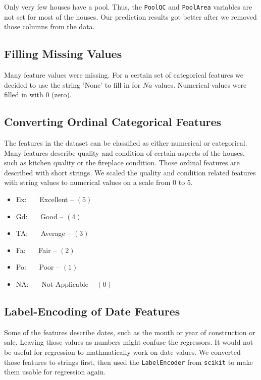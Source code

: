 Only very few houses have a pool. Thus, the \texttt{PoolQC} and \texttt{PoolArea} variables are not set for most of the houses. Our prediction results got better after we removed those columns from the data.

\subsection{Filling Missing Values}

Many feature values were missing. For a certain set of categorical features we decided to use the string 'None' to fill in for $Na$ values. Numerical values were filled in with 0 (zero).

\subsection{Converting Ordinal Categorical Features}

The features in the dataset can be classified as either numerical or categorical. Many features describe quality and condition of certain aspects of the houses, such as kitchen quality or the fireplace condition. Those ordinal features are described with short strings. We scaled the quality and condition related features with string values to numerical values on a scale from 0 to 5.

\begin{itemize}
    \item Ex:~~~ Excellent -- $(5)$
    \item Gd:~~~ Good -- $(4)$
    \item TA:~~~ Average -- $(3)$
    \item Fa:~~~ Fair -- $(2)$
    \item Po:~~~ Poor -- $(1)$
    \item NA:~~~ Not Applicable -- $(0)$
\end{itemize}

\subsection{Label-Encoding of Date Features}

Some of the features describe dates, such as the month or year of construction or sale. Leaving those values as numbers might confuse the regressors. It would not be useful for regression to mathmatically work on date values. We converted those features to strings first, then used the \texttt{LabelEncoder} from \texttt{scikit} to make them usable for regression again.

